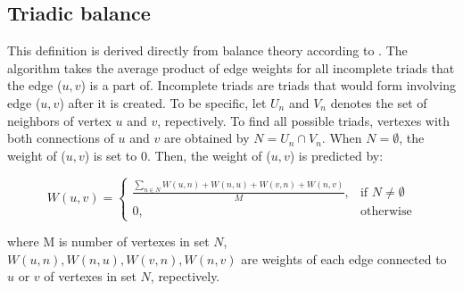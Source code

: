 \subsection{Triadic balance}
This definition is derived directly from
balance theory according to \cite{TB}. The algorithm takes the average product of edge weights for all incomplete triads
that the edge ($u,v$) is a part of. Incomplete triads are triads that would form involving
edge ($u,v$) after it is created. To be specific, let $U_n$ and $V_n$ denotes the set of
neighbors of vertex $u$ and $v$, repectively. To find all possible triads, vertexes with
both connections of $u$ and $v$ are obtained by $N = U_n \cap V_n$. When $N = \emptyset$, 
the weight of ($u,v$) is set to 0. Then, the weight of ($u,v$)
is predicted by:

\begin{equation}
W(u,v) = 
\begin{cases}
\frac{\sum_{n\in N}W(u,n)+W(n,u)+W(v,n)+W(n,v)}{M}, & \text{if $N \neq \emptyset$} \\
0, & \text{otherwise}
\end{cases}
\end{equation}

where M is number of vertexes in set $N$, $W(u,n), W(n,u), W(v,n), W(n,v)$ are weights of each edge connected
to $u$ or $v$ of vertexes in set $N$, repectively.